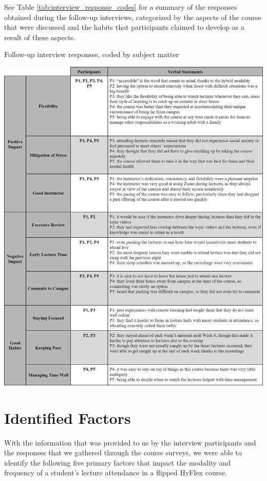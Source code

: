 See Table \ref{tab:interview_response_codes} for a summary of the responses obtained during the follow-up interviews, categorized by the aspects of the course that were discussed and the habits that participants claimed to develop as a result of these aspects.

\begin{table}[H]
    \captionsetup{justification=centering}
    \caption{Follow-up interview responses, coded by subject matter}
    \vspace{5mm}
    \centering
    \includegraphics[width= 16cm]{figures/interview_response_codes.png}
    \label{tab:interview_response_codes}
\end{table}

\section{Identified Factors}

With the information that was provided to us by the interview participants and the responses that we gathered through the course surveys, we were able to identify the following five primary factors that impact the modality and frequency of a student’s lecture attendance in a flipped HyFlex course.

